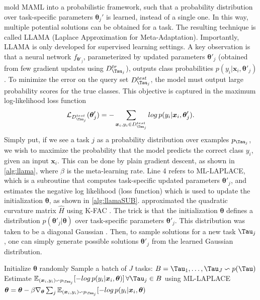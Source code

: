  mold MAML into a probabilistic framework, such that a probability distribution over task-specific parameters $\boldsymbol{\theta}_{j}'$ is learned, instead of a single one. In this way, multiple potential solutions can be obtained for a task. The resulting technique is called LLAMA (Laplace Approximation for Meta-Adaptation). Importantly, LLAMA is only developed for supervised learning settings.
A key observation is that a neural network $f_{\boldsymbol{\theta}'_{j}}$, parameterized by updated parameters $\boldsymbol{\theta}'_{j}$ (obtained from few gradient updates using $D^{tr}_{\Tau_{j}}$), outputs class probabilities $p(y_{i}| \boldsymbol{x}_{i}, \boldsymbol{\theta}'_{j})$.
To minimize the error on the query set $D^{test}_{\Tau_{j}}$, the model must output large probability scores for the true classes.
This objective is captured in the maximum log-likelihood loss function
\begin{align}
    \mathcal{L}_{D^{test}_{\Tau_{j}}}(\boldsymbol{\theta}'_{j}) = - \sum_{\boldsymbol{x}_{i},y_{i} \in D^{test}_{\Tau_{j}}} log \, p(y_{i} | \boldsymbol{x}_{i}, \boldsymbol{\theta}'_{j}).
\end{align}
Simply put, if we see a task $j$ as a probability distribution over examples $p_{\Tau_{j}}$, we wish to maximize the probability that the model predicts the correct class $y_{i}$, given an input $\boldsymbol{x}_{i}$. This can be done by plain gradient descent, as shown in \autoref{alg:llama}, where $\beta$ is the meta-learning rate. Line 4 refers to ML-LAPLACE, which is a subroutine that computes task-specific updated parameters $\boldsymbol{\theta}'_{j}$, and estimates the negative log likelihood (loss function) which is used to update the initialization $\boldsymbol{\theta}$, as shown in \autoref{alg:llamaSUB}.  approximated the quadratic curvature matrix $\hat{H}$ using K-FAC . 
The trick is that the initialization $\boldsymbol{\theta}$ defines a distribution $p(\boldsymbol{\theta}'_{j}|\boldsymbol{\theta})$ over task-specific parameters $\boldsymbol{\theta}'_{j}$. This distribution was taken to be a diagonal Gaussian . Then, to sample solutions for a new task $\Tau_{j}$, one can simply generate possible solutions $\boldsymbol{\theta}'_{j}$ from the learned Gaussian distribution. 
\begin{algorithm}
\caption{LLAMA by }\label{alg:llama}
\begin{algorithmic}[1]
\State Initialize $\boldsymbol{\theta}$ randomly
    \State Sample a batch of $J$ tasks: $B = \Tau_{1},\ldots ,\Tau_{J} \backsim p(\Tau)$
    \State Estimate $\mathbb{E}_{(\boldsymbol{x}_{i}, y_{i}) \backsim p_{\Tau_{j}}}[-log \, p(y_{i} | \boldsymbol{x}_{i}, \boldsymbol{\theta})] \, \forall \Tau_{j} \in B$ using ML-LAPLACE
    \State $\boldsymbol{\theta} = \boldsymbol{\theta} - \beta \nabla_{\boldsymbol{\theta}}\sum_{j} \mathbb{E}_{(\boldsymbol{x}_{i}, y_{i}) \backsim p_{\Tau_{j}}}[-log \, p(y_{i} | \boldsymbol{x}_{i}, \boldsymbol{\theta})$
\EndWhile
\end{algorithmic}
\end{algorithm}
